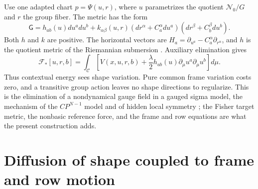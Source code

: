 Use one adapted chart $p=\Psi(u,r)$, where $u$ parametrizes the quotient $\mathcal N_0/G$ and $r$ the group fiber. The metric has the form
\begin{equation}
 \mathsf G=h_{ab}(u)du^adu^b
 +k_{\alpha\beta}(u,r)
       (dr^\alpha+C^\alpha_a du^a)(dr^\beta+C^\beta_b du^b).
 \label{comp:ctx:adapted-metric}
\end{equation}
Both $h$ and $k$ are positive. The horizontal vectors are $H_a=\partial_{u^a}-C^\alpha_a\partial_{r^\alpha}$, and $h$ is the quotient metric of the Riemannian submersion \citep{ONeill1966}. Auxiliary elimination gives
\begin{equation}
 \mathcal F_*[u,r,b]=\int_{\mathcal C}
 \left[V(x,u,r,b)+\frac\lambda2h_{ab}(u)
                         \partial_\mu u^a\partial_\mu u^b\right]d\mu.
 \label{comp:ctx:reduced}
\end{equation}
Thus contextual energy sees shape variation. Pure common frame variation costs zero, and a transitive group action leaves no shape directions to regularize. This is the elimination of a nondynamical gauge field in a gauged sigma model, the mechanism of the $CP^{N-1}$ model \citep{DAddaLuscherDiVecchia1978} and of hidden local symmetry \citep{BandoKugoYamawaki1988}; the Fisher target metric, the nonbasic reference force, and the frame and row equations are what the present construction adds.

\section{Diffusion of shape coupled to frame and row motion}

